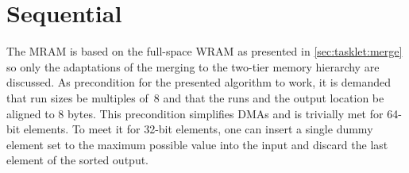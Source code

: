 \section{Sequential \texorpdfstring{\MS{}}{MergeSort}}
\label{sec:mram:merge}

The \ac{MRAM} \MS{} is based on the full-space \ac{WRAM} \MS{} as presented in \cref{sec:tasklet:merge} so only the adaptations of the merging to the two-tier memory hierarchy are discussed.
As precondition for the presented algorithm to work, it is demanded that run sizes be multiples of~8 and that the runs and the output location be aligned to 8 bytes.
This precondition simplifies \acp{DMA} and is trivially met for 64-bit elements.
To meet it for 32-bit elements, one can insert a single dummy element set to the maximum possible value into the input and discard the last element of the sorted output.






